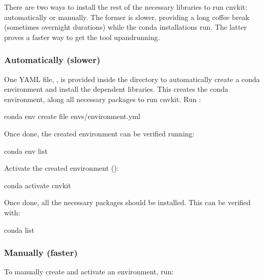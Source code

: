 \documentclass[letterpaper,10pt,english]{sphinxhowto}
\begin{document}
\sphinxAtStartPar
There are two ways to install the rest of the necessary libraries to run cnvkit: automatically or manually. The former is slower, providing a long coffee break (sometimes overnight durations) while the conda installations run. The latter proves a faster way to get the tool up\sphinxhyphen{}and\sphinxhyphen{}running.


\subsubsection{Automatically (slower)}
\label{\detokenize{index:automatically-slower}}
\sphinxAtStartPar
One YAML file, , is provided inside the  directory to automatically create a conda environment and install the dependent libraries. This creates the conda environment, along all necessary packages to run cnvkit. Run :

\begin{sphinxVerbatim}[commandchars=\\\{\}]
\PYGZdl{} conda env create \PYGZhy{}\PYGZhy{}file envs/environment.yml
\end{sphinxVerbatim}

\sphinxAtStartPar
Once done, the created environment can be verified running:

\begin{sphinxVerbatim}[commandchars=\\\{\}]
\PYGZdl{} conda env list
\end{sphinxVerbatim}

\sphinxAtStartPar
Activate the created environment ():

\begin{sphinxVerbatim}[commandchars=\\\{\}]
\PYGZdl{} conda activate cnvkit
\end{sphinxVerbatim}

\sphinxAtStartPar
Once done, all the necessary packages should be installed. This can be verified with:

\begin{sphinxVerbatim}[commandchars=\\\{\}]
\PYGZdl{} conda list
\end{sphinxVerbatim}


\subsubsection{Manually (faster)}
\label{\detokenize{index:manually-faster}}
\sphinxAtStartPar
To manually create and activate an environment, run:
\end{document}
